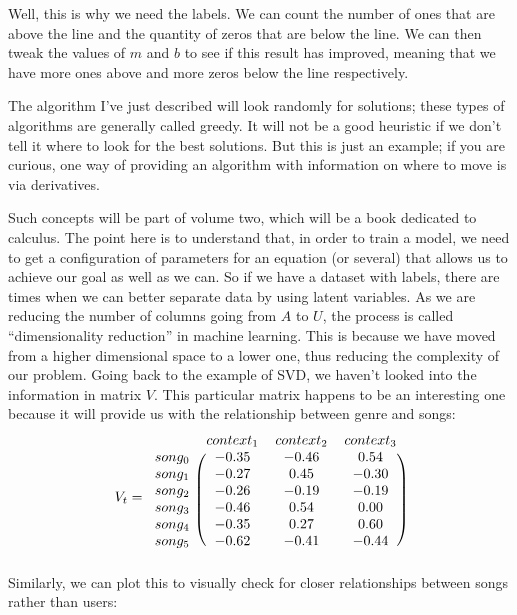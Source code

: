 \documentclass[a4,12pt,twosided,openany]{memoir}
\begin{document}
\newpage
 Well, this is why we need the labels. We can count the number of ones that are above the line and the quantity of zeros that are below the line. We can then tweak the values of $m$ and $b$ to see if this result has improved, meaning that we have more ones above and more zeros below the line respectively. 
\par 
\indent
The algorithm I’ve just described will look randomly for solutions; these types of algorithms are generally called greedy. It will not be a good heuristic if we don’t tell it where to look for the best solutions. But this is just an example; if you are curious, one way of providing an algorithm with information on where to move is via derivatives. 
\par 
\indent
Such concepts will be part of volume two, which will be a book dedicated to calculus. The point here is to understand that, in order to train a model, we need to get a configuration of parameters for an equation (or several) that allows us to achieve our goal as well as we can. So if we have a dataset with labels, there are times when we can better separate data by using latent variables. As we are reducing the number of columns going from $A$ to $U$, the process is called “dimensionality reduction” in machine learning. This is because we have moved from a higher dimensional space to a lower one, thus reducing the complexity of our problem. Going back to the example of SVD, we haven’t looked into the information in matrix $V$. This particular matrix happens to be an interesting one because it will provide us with the relationship between genre and songs:
\[V_t = 
 \begin{blockarray}{ccccc}
& context_1 & context_2 & context_3\\
\begin{block}{c(cccc)}
song_0 & -0.35  & -0.46 & 0.54\\
song_1 & -0.27  & 0.45  & -0.30\\
song_2 & -0.26  & -0.19 & -0.19\\
song_3 & -0.46  & 0.54  & 0.00\\
song_4 & -0.35  & 0.27  & 0.60\\
song_5 & -0.62  & -0.41 & -0.44\\ 
\end{block}
\end{blockarray}
\]
Similarly, we can plot this to visually check for closer relationships between songs rather than users:
\end{document}
